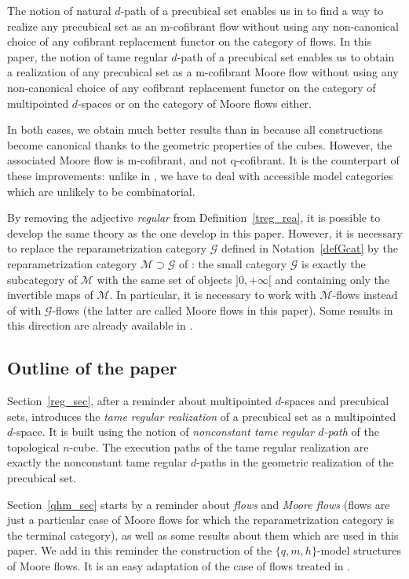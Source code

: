 \documentclass[a4paper,12pt]{amsart}
\theoremstyle{definition}
\begin{document}
The notion of natural $d$-path of a precubical set enables us in \cite{NaturalRealization} to find a way to realize any precubical set as an m-cofibrant flow without using any non-canonical choice of any cofibrant replacement functor on the category of flows. In this paper, the notion of tame regular $d$-path of a precubical set enables us to obtain a realization of any precubical set as a m-cofibrant Moore flow without using any non-canonical choice of any cofibrant replacement functor on the category of multipointed $d$-spaces or on the category of Moore flows either. 

In both cases, we obtain much better results than in \cite{realization} because all constructions become canonical thanks to the geometric properties of the cubes. However, the associated Moore flow is m-cofibrant, and not q-cofibrant. It is the counterpart of these improvements: unlike in \cite{realization}, we have to deal with accessible model categories which are unlikely to be combinatorial. 

By removing the adjective \textit{regular} from Definition~\ref{treg_rea}, it is possible to develop the same theory as the one develop in this paper. However, it is necessary to replace the reparametrization category $\mathcal{G}$ defined in Notation~\ref{defGcat} by the reparametrization category $\mathcal{M} \supset \mathcal{G}$ of \cite[Proposition~4.11]{Moore1}: the small category $\mathcal{G}$ is exactly the subcategory of $\mathcal{M}$ with the same set of objects $]0,+\infty[$ and containing only the invertible maps of $\mathcal{M}$. In particular, it is necessary to work with $\mathcal{M}$-flows instead of with $\mathcal{G}$-flows (the latter are called Moore flows in this paper). Some results in this direction are already available in \cite{Moore3}. 

\subsection*{Outline of the paper}

Section~\ref{reg_sec}, after a reminder about multipointed $d$-spaces and precubical sets, introduces the \textit{tame regular realization} of a precubical set as a multipointed $d$-space. It is built using the notion of \textit{nonconstant tame regular $d$-path} of the topological $n$-cube. The execution paths of the tame regular realization are exactly the nonconstant tame regular $d$-paths in the geometric realization of the precubical set.

Section~\ref{qhm_sec} starts by a reminder about \textit{flows} and \textit{Moore flows} (flows are just a particular case of Moore flows for which the reparametrization category is the terminal category), as well as some results about them which are used in this paper. We add in this reminder the construction of the $\{q,m,h\}$-model structures of Moore flows. It is an easy adaptation of the case of flows treated in \cite[Theorem~7.4]{QHMmodel}.
\end{document}

